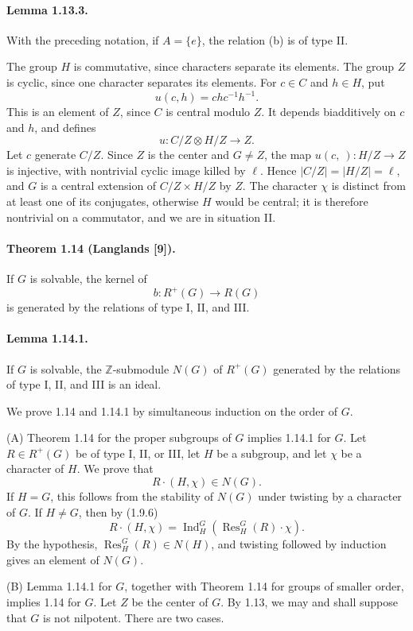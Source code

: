 \documentclass[10pt]{article}
\newcommand{\Z}{\mathbb Z}
\newcommand{\Ind}{\operatorname{Ind}}
\newcommand{\Res}{\operatorname{Res}}
\providecommand{\Ind}{\operatorname{Ind}}
\begin{document}
\paragraph{Lemma 1.13.3.} With the preceding notation, if \(A=\{e\}\), the relation (b) is of type II.

The group \(H\) is commutative, since characters separate its elements. The group \(Z\) is cyclic, since one character separates its elements. For \(c\in C\) and \(h\in H\), put
\[
u(c,h)=chc^{-1}h^{-1}.
\]
This is an element of \(Z\), since \(C\) is central modulo \(Z\). It depends biadditively on \(c\) and \(h\), and defines
\[
u:C/Z\otimes H/Z\longrightarrow Z.
\]
Let \(c\) generate \(C/Z\). Since \(Z\) is the center and \(G\ne Z\), the map \(u(c,\ ):H/Z\to Z\) is injective, with nontrivial cyclic image killed by \(\ell\). Hence \(|C/Z|=|H/Z|=\ell\), and \(G\) is a central extension of \(C/Z\times H/Z\) by \(Z\). The character \(\chi\) is distinct from at least one of its conjugates, otherwise \(H\) would be central; it is therefore nontrivial on a commutator, and we are in situation II.

\paragraph{Theorem 1.14 (Langlands [9]).} If \(G\) is solvable, the kernel of
\[
b:R^+(G)\longrightarrow R(G)
\]
is generated by the relations of type I, II, and III.

\paragraph{Lemma 1.14.1.} If \(G\) is solvable, the \(\Z\)-submodule \(N(G)\) of \(R^+(G)\) generated by the relations of type I, II, and III is an ideal.

We prove 1.14 and 1.14.1 by simultaneous induction on the order of \(G\).

(A) Theorem 1.14 for the proper subgroups of \(G\) implies 1.14.1 for \(G\). Let \(R\in R^+(G)\) be of type I, II, or III, let \(H\) be a subgroup, and let \(\chi\) be a character of \(H\). We prove that
\[
R\cdot(H,\chi)\in N(G).
\]
If \(H=G\), this follows from the stability of \(N(G)\) under twisting by a character of \(G\). If \(H\ne G\), then by (1.9.6)
\[
R\cdot(H,\chi)=\Ind_H^G(\Res_H^G(R)\cdot\chi).
\]
By the hypothesis, \(\Res_H^G(R)\in N(H)\), and twisting followed by induction gives an element of \(N(G)\).

(B) Lemma 1.14.1 for \(G\), together with Theorem 1.14 for groups of smaller order, implies 1.14 for \(G\). Let \(Z\) be the center of \(G\). By 1.13, we may and shall suppose that \(G\) is not nilpotent. There are two cases.
\end{document}
